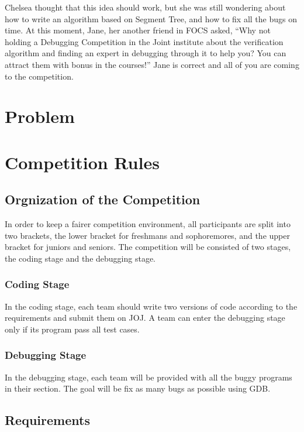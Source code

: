 \documentclass[11pt,a4paper]{article}
\begin{document}
Chelsea thought that this idea should work, but she was still wondering about how to write an algorithm based on Segment Tree, and how to fix all the bugs on time. At this moment, Jane, her another friend in FOCS asked, ``Why not holding a Debugging Competition in the Joint institute about the verification algorithm and  finding an expert in debugging through it to help you? You can attract them with bonus in the courses!'' Jane is correct and all of you are coming to the competition.

\section{Problem}




\section{Competition Rules}

\subsection{Orgnization of the Competition}

In order to keep a fairer competition environment, all participants are split into two brackets, the lower bracket for freshmans and sophoremores, and the upper bracket for juniors and seniors. The competition will be consisted of two stages, the coding stage and the debugging stage.

\subsubsection{Coding Stage}

In the coding stage, each team should write two versions of code according to the requirements and submit them on JOJ. A team can enter the debugging stage only if its program pass all test cases.

\subsubsection{Debugging Stage}

In the debugging stage, each team will be provided with all the buggy programs in their section. The goal will be fix as many bugs as possible using GDB.

\subsection{Requirements}
\end{document}
